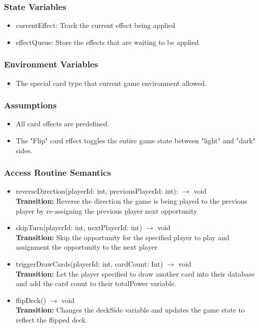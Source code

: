 \documentclass[12pt, titlepage]{article}
\begin{document}
\subsubsection{State Variables}
\begin{itemize}
\item currentEffect: Track the current effect being applied
\item effectQueue: Store the effects that are waiting to be applied
\end{itemize}

\subsubsection{Environment Variables}
\begin{itemize}
    \item The special card type that current game environment allowed.
\end{itemize}

\subsubsection{Assumptions}
\begin{itemize}
\item All card effects are predefined.
\item The "Flip" card effect toggles the entire game state between "light" and "dark" sides.
\end{itemize}

\subsubsection{Access Routine Semantics}

\begin{itemize}
\item reverseDirection(playerId: int, previousPlayerId: int): $\rightarrow$ void\\
\textbf{Transition:} Reverse the direction the game is being played to the previous player by re-assigning the previous player next opportunity

\item skipTurn(playerId: int, nextPlayerId: int) $\rightarrow$ void\\
\textbf{Transition:} Skip the opportunity for the specified player to play and assignment the opportunity to the next player

\item triggerDrawCards(playerId: int, cardCount: Int) $\rightarrow$ void\\
\textbf{Transition:} Let the player specified to draw another card into their database and add the card count to their totalPower variable.

\item flipDeck() $\rightarrow$ void\\
\textbf{Transition:} Changes the deckSide variable and updates the game state to reflect the flipped deck.

\end{itemize}
\end{document}
